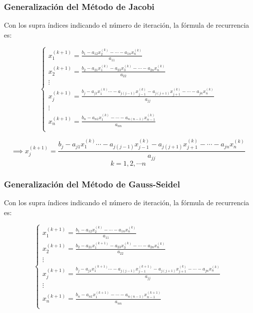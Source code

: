\documentclass[openany]{book}
\begin{document}
\hypertarget{generalizaciuxf3n-del-muxe9todo-de-jacobi}{%
\subsubsection*{Generalización del Método de Jacobi}\label{generalizaciuxf3n-del-muxe9todo-de-jacobi}}

Con los supra índices indicando el número de iteración, la fórmula de recurrencia es:

\[
\begin{cases} 
x_1^{(k+1)} = \frac{b_1 - a_{12}x_2^{(k)} - \cdots - a_{1n}x_n^{(k)}}{ a_{11}}\\
x_2^{(k+1)} = \frac{b_2 - a_{21}x_1^{(k)} - a_{23}x_3^{(k)} - \cdots - a_{2n}x_n^{(k)}}{ a_{22}}\\
\vdots \\
x_j^{(k+1)} = \frac{b_j - a_{j1}x_1^{(k)} \cdots - a_{j(j-1)}x_{j-1}^{(k)} - a_{j(j+1)}x_{j+1}^{(k)} - \cdots - a_{jn}x_n^{(k)}}{ a_{jj}}\\
\vdots \\
x_n^{(k+1)} = \frac{b_n - a_{n1}x_1^{(k)} - \cdots - a_{n(n-1)}x_{n-1}^{(k)}}{a_{nn}}\\
\end{cases}
\]

\[
\implies
x_j^{(k+1)} = \frac{b_j - a_{j1}x_1^{(k)} \cdots - a_{j(j-1)}x_{j-1}^{(k)} - a_{j(j+1)}x_{j+1}^{(k)} - \cdots - a_{jn}x_n^{(k)}}{ a_{jj}}
\]
\[
k=1, 2, \cdots n
\]

\hypertarget{generalizaciuxf3n-del-muxe9todo-de-gauss-seidel}{%
\subsubsection*{Generalización del Método de Gauss-Seidel}\label{generalizaciuxf3n-del-muxe9todo-de-gauss-seidel}}

Con los supra índices indicando el número de iteración, la fórmula de recurrencia es:

\[
\begin{cases} 
x_1^{(k+1)} = \frac{b_1 - a_{12}x_2^{(k)} - \cdots - a_{1n}x_n^{(k)}}{ a_{11}}\\
x_2^{(k+1)} = \frac{b_2 - a_{21}x_1^{(k+1)} - a_{23}x_3^{(k)} - \cdots - a_{2n}x_n^{(k)}}{ a_{22}}\\
\vdots \\
x_j^{(k+1)} = \frac{b_j - a_{j1}x_1^{(k+1)} \cdots - a_{j(j-1)}x_{j-1}^{(k+1)} - a_{j(j+1)}x_{j+1}^{(k)} - \cdots - a_{jn}x_n^{(k)}}{ a_{jj}}\\
\vdots \\
x_n^{(k+1)} = \frac{b_n - a_{n1}x_1^{(k+1)} - \cdots - a_{n(n-1)}x_{n-1}^{(k+1)}}{a_{nn}}\\
\end{cases}
\]
\end{document}
